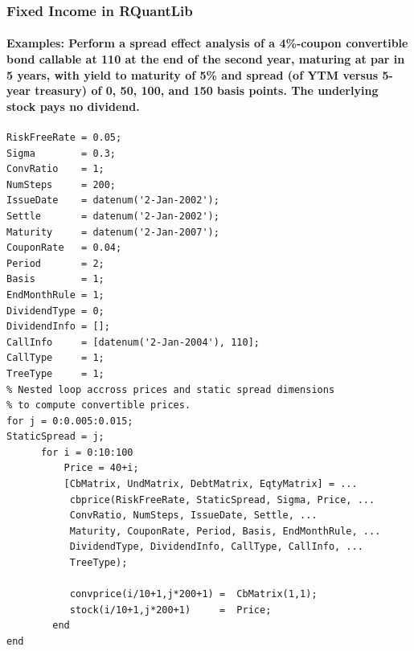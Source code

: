 \documentclass[smaller,compress, 9pt]{beamer}
\begin{document}
\begin{frame}[fragile]
	\frametitle{Fixed Income in RQuantLib}
	\framesubtitle{Examples: Perform a spread effect analysis of a 4\%-coupon convertible bond callable at 110 at the end of the second year, maturing at par in 5 years, with yield to maturity of 5\% and spread (of YTM versus 5-year treasury) of 0, 50, 100, and 150 basis points. The underlying stock pays no dividend.}	

\lstset{language=Matlab,basicstyle=\tiny}
	\begin{lstlisting}
RiskFreeRate = 0.05;
Sigma        = 0.3;
ConvRatio    = 1;
NumSteps     = 200;
IssueDate    = datenum('2-Jan-2002');
Settle       = datenum('2-Jan-2002');
Maturity     = datenum('2-Jan-2007');
CouponRate   = 0.04;
Period       = 2;
Basis        = 1;
EndMonthRule = 1;
DividendType = 0;
DividendInfo = [];
CallInfo     = [datenum('2-Jan-2004'), 110]; 
CallType     = 1;
TreeType     = 1;   
% Nested loop accross prices and static spread dimensions
% to compute convertible prices.
for j = 0:0.005:0.015;
StaticSpread = j;
      for i = 0:10:100
          Price = 40+i;
          [CbMatrix, UndMatrix, DebtMatrix, EqtyMatrix] = ...
           cbprice(RiskFreeRate, StaticSpread, Sigma, Price, ...
           ConvRatio, NumSteps, IssueDate, Settle, ...
           Maturity, CouponRate, Period, Basis, EndMonthRule, ...
           DividendType, DividendInfo, CallType, CallInfo, ...
           TreeType);
   
           convprice(i/10+1,j*200+1) =  CbMatrix(1,1);
           stock(i/10+1,j*200+1)     =  Price;
        end    
end
\end{lstlisting}
\end{frame}
\end{document}
